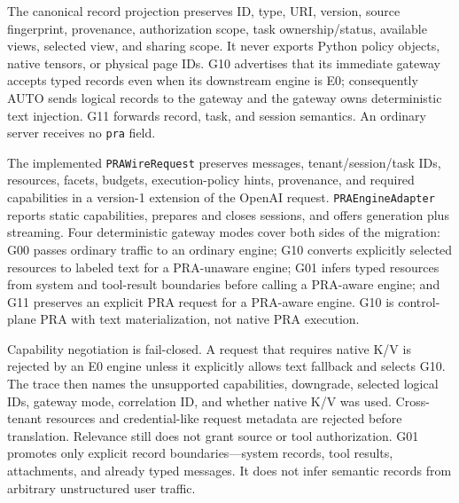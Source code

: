\documentclass[11pt]{article}
\begin{document}
The canonical record projection preserves ID, type, URI, version, source
fingerprint, provenance, authorization scope, task ownership/status, available
views, selected view, and sharing scope. It never exports Python policy objects,
native tensors, or physical page IDs. G10 advertises that its immediate gateway
accepts typed records even when its downstream engine is E0; consequently AUTO
sends logical records to the gateway and the gateway owns deterministic text
injection. G11 forwards record, task, and session semantics. An ordinary server
receives no \texttt{pra} field.

The implemented \texttt{PRAWireRequest} preserves messages, tenant/session/task
IDs, resources, facets, budgets, execution-policy hints, provenance, and
required capabilities in a version-1 extension of the OpenAI request.
\texttt{PRAEngineAdapter} reports static capabilities,
prepares and closes sessions, and offers generation plus streaming. Four deterministic gateway modes cover both sides of the migration:
G00 passes ordinary traffic to an ordinary engine; G10 converts explicitly
selected resources to labeled text for a PRA-unaware engine; G01 infers typed
resources from system and tool-result boundaries before calling a PRA-aware
engine; and G11 preserves an explicit PRA request for a PRA-aware engine. G10
is control-plane PRA with text materialization, not native PRA execution.

Capability negotiation is fail-closed. A request that requires native K/V is
rejected by an E0 engine unless it explicitly allows text fallback and selects
G10. The trace then names the unsupported capabilities, downgrade, selected
logical IDs, gateway mode, correlation ID, and whether native K/V was used.
Cross-tenant resources and credential-like request metadata are rejected before
translation. Relevance still does not grant source or tool authorization.
G01 promotes only explicit record boundaries---system records, tool results,
attachments, and already typed messages. It does not infer semantic records
from arbitrary unstructured user traffic.
\end{document}
